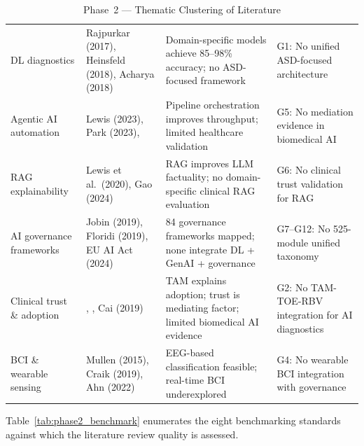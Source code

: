 \begingroup\singlespacing\tablefontsize\tablestripes
\begin{xltabular}{\textwidth}{@{} p{0.15\textwidth} X X X @{}}
\caption{Phase~2 --- Thematic Clustering of Literature}
\label{tab:phase2_themes}\\
\toprule
{} &  &  &  \\
\midrule
\endfirsthead
\endhead
\bottomrule
\endlastfoot
DL diagnostics          & Rajpurkar (2017), Heinsfeld (2018), Acharya (2018)    & Domain-specific models achieve 85--98\% accuracy; no ASD-focused framework              & G1: No unified ASD-focused architecture \\
\addlinespace
Agentic AI automation      & Lewis (2023), Park (2023), \citet{wang2024agentai}                & Pipeline orchestration improves throughput; limited healthcare validation                 & G5: No mediation evidence in biomedical AI \\
\addlinespace
RAG explainability         & Lewis et al.\ (2020), Gao (2024)                     & RAG improves LLM factuality; no domain-specific clinical RAG evaluation                  & G6: No clinical trust validation for RAG \\
\addlinespace
AI governance frameworks   & Jobin (2019), Floridi (2019), EU AI Act (2024)        & 84 governance frameworks mapped; none integrate DL + GenAI + governance                  & G7--G12: No 525-module unified taxonomy \\
\addlinespace
Clinical trust \& adoption & \citet{davis1989tam}, \citet{venkatesh2003utaut}, Cai (2019)            & TAM explains adoption; trust is mediating factor; limited biomedical AI evidence          & G2: No TAM-TOE-RBV integration for AI diagnostics \\
\addlinespace
BCI \& wearable sensing    & Mullen (2015), Craik (2019), Ahn (2022)               & EEG-based classification feasible; real-time BCI underexplored                           & G4: No wearable BCI integration with governance \\
\end{xltabular}
\endgroup

\vspace{1.5em}

Table~\ref{tab:phase2_benchmark} enumerates the eight benchmarking standards against which the literature review quality is assessed.

